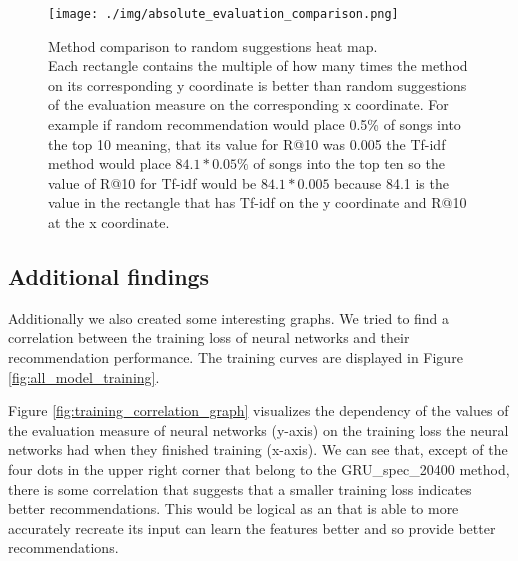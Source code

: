 \begin{figure}[h]
    \centering
	\texttt{[image: ./img/absolute\_evaluation\_comparison.png]}
	\caption[Method comparison to random suggestions heat map]{Method comparison to random suggestions heat map. \\
Each rectangle contains the multiple of how many times the method on its corresponding y coordinate is better than random suggestions of the evaluation measure on the corresponding x coordinate. For example if random recommendation would place 0.5\% of songs into the top 10 meaning, that its value for R@10 was 0.005 the Tf-idf method would place $84.1*0.05\%$ of songs into the top ten so the value of R@10 for Tf-idf would be $84.1*0.005$ because 84.1 is the value in the rectangle that has Tf-idf on the y coordinate and R@10 at the x coordinate.}
	\label{fig:absolute_evaluation_comparison}
\end{figure}

\subsection{Additional findings}\label{ssec:additional findings}
Additionally we also created some interesting graphs. We tried to find a correlation between the training loss of neural networks and their recommendation performance. The training curves are displayed in Figure \ref{fig:all_model_training}. 

Figure \ref{fig:training_correlation_graph} visualizes the dependency of the values of the evaluation measure of neural networks (y-axis) on the training loss the neural networks had when they finished training (x-axis). We can see that, except of the four dots in the upper right corner that belong to the GRU\_spec\_20400 method, there is some correlation that suggests that a smaller training loss indicates better recommendations. This would be logical as an that is able to more accurately recreate its input can learn the features better and so provide better recommendations.

